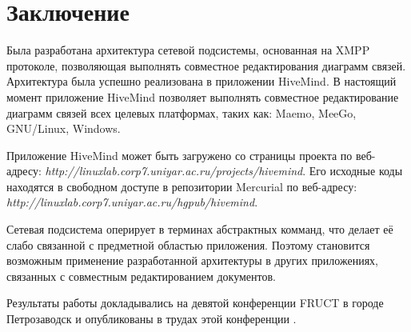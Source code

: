 \newpage

\chapter*{Заключение}


Была разработана архитектура сетевой подсистемы, основанная на
XMPP протоколе, позволяющая выполнять совместное редактирования диаграмм связей.
Архитектура была успешно реализована в приложении HiveMind. В настоящий момент
приложение HiveMind позволяет выполнять совместное редактирование диаграмм
связей всех целевых платформах, таких как: Maemo, MeeGo, GNU/Linux, Windows.

Приложение HiveMind может быть загружено со страницы проекта по веб-адресу:
\emph{http://linuxlab.corp7.uniyar.ac.ru/projects/hivemind}. Его исходные коды
находятся в свободном доступе в репозитории Mercurial по веб-адресу:
\emph{http://linuxlab.corp7.uniyar.ac.ru/hgpub/hivemind}.

Сетевая подсистема оперирует в терминах абстрактных комманд, что делает её
слабо связанной с предметной областью приложения. Поэтому становится возможным
применение разработанной архитектуры в других приложениях, связанных с
совместным редактированием документов.

Результаты работы докладывались на девятой конференции FRUCT в городе
Петрозаводск и опубликованы в трудах этой конференции \cite{hivemind-9th-fruct}.
